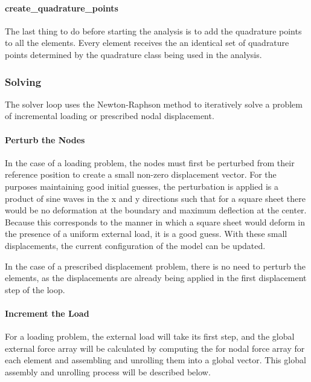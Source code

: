\documentclass[]{spie}  %
\begin{document}
\paragraph{create\_quadrature\_points}
The last thing to do before starting the analysis is to add the quadrature points to all the elements. Every element receives the an identical set of quadrature points determined by the quadrature class being used in the analysis.

\subsubsection{Solving}
The solver loop uses the Newton-Raphson method to iteratively solve a problem of incremental loading or prescribed nodal displacement.

\paragraph{Perturb the Nodes} 
In the case of a loading problem, the nodes must first be perturbed from their reference position to create a small non-zero displacement vector. For the purposes maintaining good initial guesses, the perturbation is applied is a product of sine waves in the x and y directions such that for a square sheet there would be no deformation at the boundary and maximum deflection at the center. Because this corresponds to the manner in which a square sheet would deform in the presence of a uniform external load, it is a good guess. With these small displacements, the current configuration of the model can be updated. 

In the case of a prescribed displacement problem, there is no need to perturb the elements, as the displacements are already being applied in the first displacement step of the loop. 

\paragraph{Increment the Load}
For a loading problem, the external load will take its first step, and the global external force array will be calculated by computing the for nodal force array for each element and assembling and unrolling them into a global vector. This global assembly and unrolling process will be described below.
\end{document}
